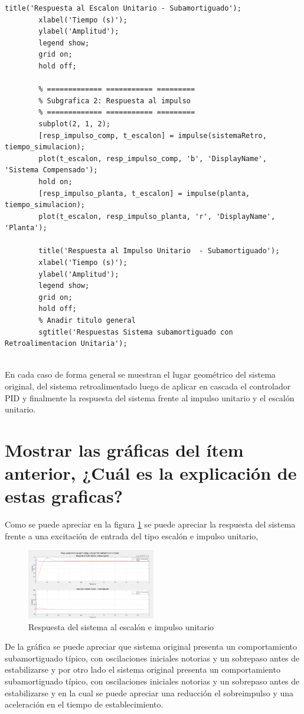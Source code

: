 \documentclass[conference]{IEEEtran}
\begin{document}
\begin{lstlisting}[numbers=none, caption={Controlador PID}]
		title('Respuesta al Escalon Unitario - Subamortiguado');
		xlabel('Tiempo (s)');
		ylabel('Amplitud');
		legend show;
		grid on; 
		hold off;
		
		% ============= =========== =========
		% Subgrafica 2: Respuesta al impulso
		% ============= =========== =========
		subplot(2, 1, 2); 
		[resp_impulso_comp, t_escalon] = impulse(sistemaRetro, tiempo_simulacion);
		plot(t_escalon, resp_impulso_comp, 'b', 'DisplayName', 'Sistema Compensado');
		hold on;
		[resp_impulso_planta, t_escalon] = impulse(planta, tiempo_simulacion);
		plot(t_escalon, resp_impulso_planta, 'r', 'DisplayName', 'Planta');
		
		title('Respuesta al Impulso Unitario  - Subamortiguado');
		xlabel('Tiempo (s)');
		ylabel('Amplitud'); 
		legend show;
		grid on; 
		hold off;
		% Anadir titulo general 
		sgtitle('Respuestas Sistema subamortiguado con Retroalimentacion Unitaria');
		
	\end{lstlisting}
	
	En cada caso de forma general se muestran el lugar geométrico del sistema original, del sistema retroalimentado luego de aplicar en cascada el controlador PID y finalmente la respuesta del sistema frente al impulso unitario y el escalón unitario.
	
	\section{Mostrar las gráficas del ítem anterior, ¿Cuál es la explicación de estas graficas?}
	Como se puede apreciar en la figura \ref{fig:respuesta-sistema} se puede apreciar la respuesta del sistema frente a una excitación de entrada del tipo escalón e impulso unitario, 
	
	\begin{figure}[h]
		\centering
		\includegraphics[width=0.5\textwidth]{media/respuesta-sistema.png}
		\caption{Respuesta del sistema al escalón e impulso unitario}
		\label{fig:respuesta-sistema}
	\end{figure}
	De la gráfica se puede apreciar que sistema original presenta un comportamiento subamortiguado típico, con oscilaciones iniciales notorias y un sobrepaso antes de estabilizarse y por otro lado el sistema original presenta un comportamiento subamortiguado típico, con oscilaciones iniciales notorias y un sobrepaso antes de estabilizarse y en la cual se puede apreciar una reducción el sobreimpulso y una aceleración en el tiempo de establecimiento.
	
	
	
\end{document}
